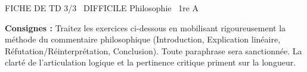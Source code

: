 \documentclass[11pt]{article}
\begin{document}
\begin{tcolorbox}[enhanced,colback=popink,colframe=popink,arc=10pt,boxrule=0pt,left=12pt,right=12pt,top=9pt,bottom=9pt]
{\color{white}\popxbold\small FICHE DE TD 3/3 \textbullet\ DIFFICILE \hfill Philosophie \textbullet\ 1re A\par}
\end{tcolorbox}
\vspace{4pt}
\noindent \textbf{Consignes :} Traitez les exercices ci-dessous en mobilisant rigoureusement la méthode du commentaire philosophique (Introduction, Explication linéaire, Réfutation/Réinterprétation, Conclusion). Toute paraphrase sera sanctionnée. La clarté de l'articulation logique et la pertinence critique priment sur la longueur.
\end{document}
